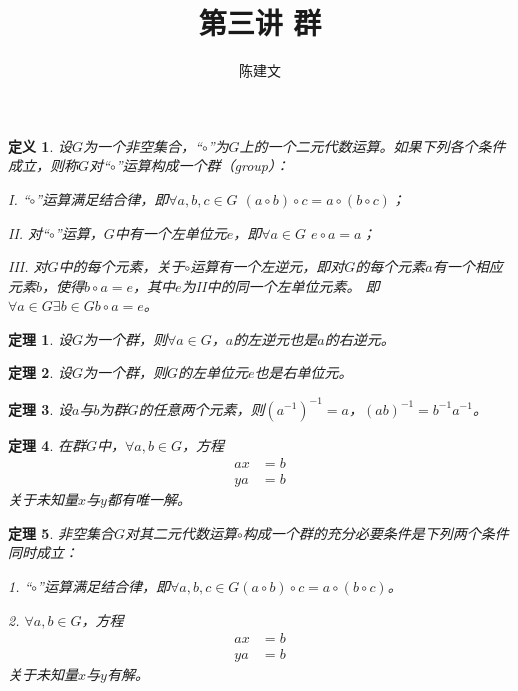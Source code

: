 \documentclass{article}
\newtheorem{Def}{定义}
\newtheorem{Thm}{定理}
\begin{document}
\begin{CJK*}{UTF8}{gbsn}
  \title{第三讲 群}
  \author{陈建文}
  \maketitle
  

\begin{Def}
  设$G$为一个非空集合，“$\circ$”为$G$上的一个二元代数运算。如果下列各个条件成立，则称$G$对“$\circ$”运算构成一个群（group）：

  I. “$\circ$”运算满足结合律，即$\forall a,b,c \in G$ $(a\circ b)\circ c = a\circ(b\circ c)$；

  II. 对“$\circ$”运算，$G$中有一个左单位元$e$，即$\forall a\in G$ $e\circ a = a$；

  III. 对$G$中的每个元素，关于$\circ$运算有一个左逆元，即对$G$的每个元素$a$有一个相应元素$b$，使得$b\circ a=e$，其中$e$为II中的同一个左单位元素。
  即$\forall a\in G \exists b\in G b\circ a = e$。
\end{Def}

\begin{Thm}
  设$G$为一个群，则$\forall a\in G$，$a$的左逆元也是$a$的右逆元。
\end{Thm}

\begin{Thm}
  设$G$为一个群，则$G$的左单位元$e$也是右单位元。
\end{Thm}

\begin{Thm}
  设$a$与$b$为群$G$的任意两个元素，则$(a^{-1})^{-1}=a$，$(ab)^{-1}=b^{-1}a^{-1}$。
\end{Thm}
\begin{Thm}
 在群$G$中，$\forall a, b \in G$，方程
 \begin{align*}
  ax&=b\\
  ya&=b
 \end{align*}
 关于未知量$x$与$y$都有唯一解。 
\end{Thm}

\begin{Thm}
  非空集合$G$对其二元代数运算$\circ$构成一个群的充分必要条件是下列两个条件同时成立：

  1. “$\circ$”运算满足结合律，即$\forall a,b,c\in G (a\circ b)\circ c=a\circ(b\circ c)$。

  2. $\forall a,b\in G$，方程
  \begin{align*}
    ax&=b\\
    ya&=b
   \end{align*}
   关于未知量$x$与$y$有解。
\end{Thm}


\end{CJK*}
\end{document}
